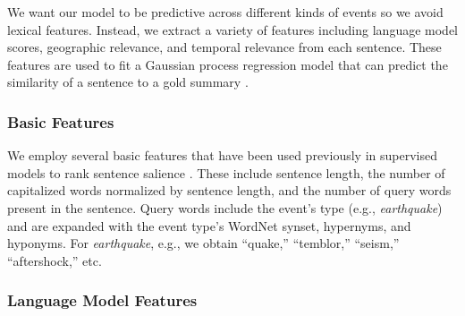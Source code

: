 \documentclass{sig-alternate}
\begin{document}
 

We want our model to be predictive across different kinds of events so we
avoid lexical features.  Instead, we extract a variety of features including
language model scores, geographic relevance, and temporal relevance from each
sentence.  These features are used to fit a Gaussian process regression model
that can predict the similarity of a sentence to a gold summary
\cite{preotiuc2013temporal}.  

\subsubsection{Basic Features}

We employ several basic features that have been used previously in supervised
models to rank sentence salience \cite{kupiec1995trainable,conroy2001using}.
These include sentence length, the number of capitalized words normalized by
sentence length, and the number of query words present in the sentence.  Query
words include the event's type (e.g., \emph{earthquake}) and are expanded with
the event type's WordNet \cite{miller1995wordnet} synset, hypernyms, and
hyponyms.  For \emph{earthquake}, e.g., we obtain ``quake,'' ``temblor,''
``seism,'' ``aftershock,'' etc.   


\subsubsection{Language Model Features}\label{subsubsec:lm}
\end{document}
